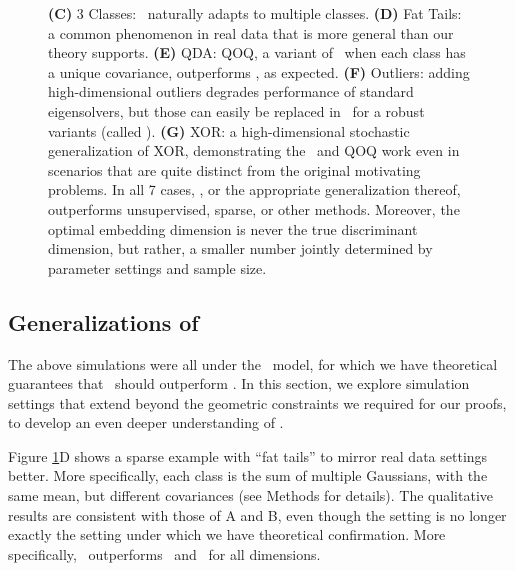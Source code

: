\documentclass[10pt]{article}
\begin{document}
\begin{figure}[h!]
{\textbf{(C)} 3 Classes: \Lol~naturally adapts to multiple classes.
\textbf{(D)} Fat Tails: a common phenomenon in real data that is more general than our theory supports.
\textbf{(E)} QDA: QOQ, a variant of \Lol~when each class has a unique covariance, outperforms \Lol, as expected.
\textbf{(F)} Outliers: adding high-dimensional outliers degrades performance of standard eigensolvers, but those can easily be replaced in \Lol~for a robust variants (called \Lrl).
\textbf{(G)} XOR: a high-dimensional stochastic generalization of XOR, demonstrating the \Lol~and QOQ work even in scenarios that are quite distinct from the original motivating problems.
In all 7 cases, \Lol, or the appropriate generalization thereof, outperforms unsupervised, sparse, or other methods.  Moreover, the optimal embedding dimension is never the true discriminant dimension, but rather, a smaller number jointly determined by parameter settings and sample size.
}
\label{f:properties}
\end{figure}



\subsection*{Generalizations of \Lol}


The above simulations were all under the \Lda~model, for which we have theoretical guarantees that \Lol~should outperform \PoF.  In this section, we explore simulation settings that extend beyond the geometric constraints we required for our proofs, to develop an even deeper understanding of \Lol.

 Figure \ref{f:properties}D shows a sparse example with ``fat tails'' to mirror real data settings better. More specifically, each class is the sum of multiple Gaussians, with the same mean, but different covariances (see Methods for details). The qualitative results are consistent with those of A and B, even though the setting is no longer exactly the setting under which we have theoretical confirmation. More specifically, \Lol~outperforms \PoF~and \Road~for all dimensions.  
\end{document}
